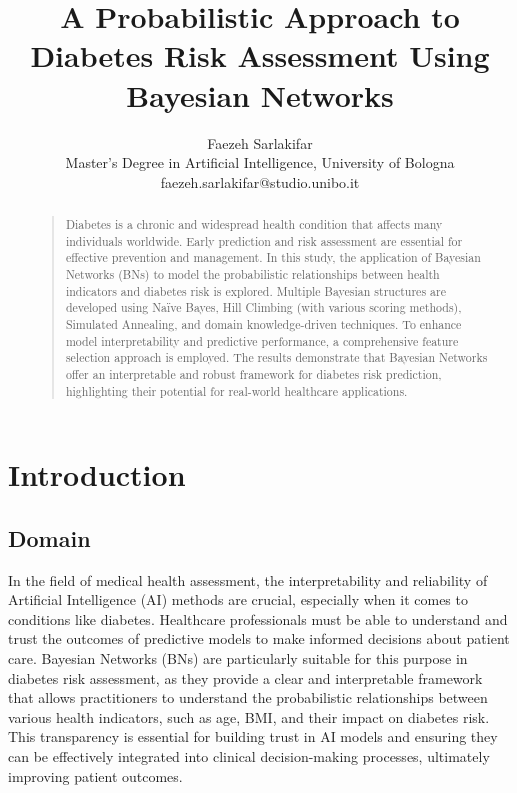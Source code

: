\documentclass[letterpaper]{article}
\begin{document}
 	
%
\title{A Probabilistic Approach to Diabetes Risk Assessment Using Bayesian Networks}
\author{Faezeh Sarlakifar\\
Master's Degree in Artificial Intelligence, University of Bologna\\
faezeh.sarlakifar@studio.unibo.it
}
\maketitle


\begin{abstract}
\begin{quote}

Diabetes is a chronic and widespread health condition that affects many individuals worldwide. Early prediction and risk assessment are essential for effective prevention and management. In this study, the application of Bayesian Networks (BNs) to model the probabilistic relationships between health indicators and diabetes risk is explored. Multiple Bayesian structures are developed using Naïve Bayes, Hill Climbing (with various scoring methods), Simulated Annealing, and domain knowledge-driven techniques. To enhance model interpretability and predictive performance, a comprehensive feature selection approach is employed. The results demonstrate that Bayesian Networks offer an interpretable and robust framework for diabetes risk prediction, highlighting their potential for real-world healthcare applications.

\end{quote}
\end{abstract}


\section{Introduction}

\subsection{Domain}

In the field of medical health assessment, the interpretability and reliability of Artificial Intelligence (AI) methods are crucial, especially when it comes to conditions like diabetes. Healthcare professionals must be able to understand and trust the outcomes of predictive models to make informed decisions about patient care. Bayesian Networks (BNs) are particularly suitable for this purpose in diabetes risk assessment, as they provide a clear and interpretable framework that allows practitioners to understand the probabilistic relationships between various health indicators, such as age, BMI, and their impact on diabetes risk. This transparency is essential for building trust in AI models and ensuring they can be effectively integrated into clinical decision-making processes, ultimately improving patient outcomes.
\end{document}
